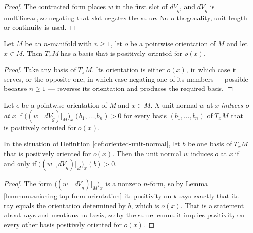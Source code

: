 \begin{proof}
\leanok
The contracted form places $w$ in the first slot of $dV_{\tilde g}$, and $dV_{\tilde g}$ is
multilinear, so negating that slot negates the value. No orthogonality, unit length or continuity
is used.
\end{proof}

\begin{lemma}
\label{lem:basis-realizing-orientation}
\leanok
{}
Let $M$ be an $n$-manifold with $n \geq 1$, let $o$ be a pointwise orientation of $M$ and let
$x \in M$. Then $T_x M$ has a basis that is positively oriented for $o(x)$.
\end{lemma}

\begin{proof}
\leanok
Take any basis of $T_x M$. Its orientation is either $o(x)$, in which case it serves, or the
opposite one, in which case negating one of its members — possible because $n \geq 1$ — reverses
its orientation and produces the required basis.
\end{proof}

\begin{definition}
\label{def:oriented-unit-normal}
\leanok
{}
Let $o$ be a pointwise orientation of $M$ and $x \in M$. A unit normal $w$ at $x$
\emph{induces $o$ at $x$} if
$\bigl((w \lrcorner dV_{\tilde g})|_M\bigr)_x(b_1,\ldots,b_n) > 0$ for every basis
$(b_1,\ldots,b_n)$ of $T_x M$ that is positively oriented for $o(x)$.
\end{definition}

\begin{lemma}
\label{lem:oriented-unit-normal-iff-pos}
\leanok
{}
In the situation of Definition \ref{def:oriented-unit-normal}, let $b$ be one basis of $T_x M$
that is positively oriented for $o(x)$. Then the unit normal $w$ induces $o$ at $x$ if and only if
$\bigl((w \lrcorner dV_{\tilde g})|_M\bigr)_x(b) > 0$.
\end{lemma}

\begin{proof}
\leanok
{}
The form $\bigl((w \lrcorner dV_{\tilde g})|_M\bigr)_x$ is a nonzero $n$-form, so by Lemma
\ref{lem:nonvanishing-top-form-orientation} its positivity on $b$ says exactly that its ray equals
the orientation determined by $b$, which is $o(x)$. That is a statement about rays and mentions no
basis, so by the same lemma it implies positivity on every other basis positively oriented for
$o(x)$.
\end{proof}

